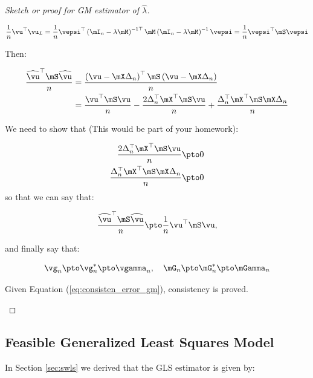 \documentclass[english,12pt]{book}\usepackage[]{graphicx}\usepackage[]{xcolor}
\begin{document}
\begin{proof}[Sketch or proof for GM estimator of $\widehat{\lambda}$]
\begin{enumerate}
\begin{equation*}
      \frac{1}{n}\vu^\top\vu_L  = \frac{1}{n} \vepsi^{\top}\left(\mI_n - \lambda\mM\right)^{-1\top}\mM\left(\mI_n - \lambda\mM\right)^{-1}\vepsi = \frac{1}{n}\vepsi^\top\mS\vepsi
\end{equation*}

Then:

\begin{equation*}
\begin{aligned}
\frac{\widehat{\vu}^\top\mS\widehat{\vu}}{n} & = \frac{\left(\vu - \mX\Delta_n \right)^\top\mS\left(\vu - \mX\Delta_n \right)}{n} \\
& = \frac{\vu^\top\mS\vu}{n}- \frac{2\Delta_n^\top\mX^\top\mS\vu}{n}+\frac{\Delta_n^\top\mX^\top\mS\mX\Delta_n}{n}
\end{aligned}
\end{equation*}

We need to show that (This would be part of your homework):

\begin{equation*}
\begin{aligned}
  \frac{2\Delta_n^\top\mX^\top\mS\vu}{n} & \pto 0 \\
  \frac{\Delta_n^\top\mX^\top\mS\mX\Delta_n}{n} & \pto 0
\end{aligned}
\end{equation*}
%
so that we can say that:

\begin{equation*}
\frac{\widehat{\vu}^\top\mS\widehat{\vu}}{n}  \pto \frac{1}{n}\vu^\top\mS\vu,
\end{equation*}

and finally say that:

\begin{equation*}
\vg_n\pto \vg_n^*\pto \vgamma_n, \quad \mG_n\pto \mG^*_n\pto \mGamma_n
\end{equation*}

Given Equation (\ref{eq:consisten_error_gm}), consistency is proved.
\end{enumerate}
\end{proof}


\subsection{Feasible Generalized Least Squares Model}

In Section \ref{sec:swls} we derived that the GLS estimator is given by:
\end{document}
